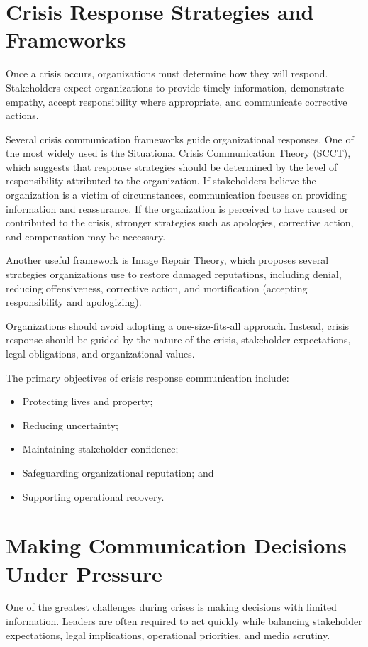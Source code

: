 \documentclass[10pt]{article}
\begin{document}
\section*{Crisis Response Strategies and Frameworks}

Once a crisis occurs, organizations must determine how they will respond. Stakeholders expect organizations to provide timely information, demonstrate empathy, accept responsibility where appropriate, and communicate corrective actions.

Several crisis communication frameworks guide organizational responses. One of the most widely used is the Situational Crisis Communication Theory (SCCT), which suggests that response strategies should be determined by the level of responsibility attributed to the organization. If stakeholders believe the organization is a victim of circumstances, communication focuses on providing information and reassurance. If the organization is perceived to have caused or contributed to the crisis, stronger strategies such as apologies, corrective action, and compensation may be necessary.

Another useful framework is Image Repair Theory, which proposes several strategies organizations use to restore damaged reputations, including denial, reducing offensiveness, corrective action, and mortification (accepting responsibility and apologizing).

Organizations should avoid adopting a one-size-fits-all approach. Instead, crisis response should be guided by the nature of the crisis, stakeholder expectations, legal obligations, and organizational values.

The primary objectives of crisis response communication include:
\begin{itemize}
    \item Protecting lives and property;
    \item Reducing uncertainty;
    \item Maintaining stakeholder confidence;
    \item Safeguarding organizational reputation; and
    \item Supporting operational recovery.
\end{itemize}

\section*{Making Communication Decisions Under Pressure}

One of the greatest challenges during crises is making decisions with limited information. Leaders are often required to act quickly while balancing stakeholder expectations, legal implications, operational priorities, and media scrutiny.
\end{document}
